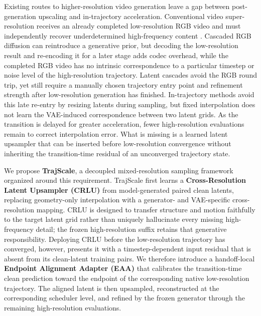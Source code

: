 Existing routes to higher-resolution video generation leave a gap between
post-generation upscaling and in-trajectory acceleration. Conventional video
super-resolution receives an already completed low-resolution RGB video and
must independently recover underdetermined high-frequency content
\citep{zhou2024upscale,xu2024videogigagan}. Cascaded RGB diffusion can
reintroduce a generative prior, but decoding the low-resolution result and
re-encoding it for a later stage adds codec overhead, while the completed RGB
video has no intrinsic correspondence to a particular timestep or noise level
of the high-resolution trajectory. Latent cascades avoid the RGB round trip,
yet still require a manually chosen trajectory entry point and refinement
strength after low-resolution generation has finished. In-trajectory methods
avoid this late re-entry by resizing latents during sampling, but fixed
interpolation does not learn the VAE-induced correspondence between two latent
grids. As the transition is delayed for greater acceleration, fewer
high-resolution evaluations remain to correct interpolation error. What is
missing is a learned latent upsampler that can be inserted before
low-resolution convergence without inheriting the transition-time residual of
an unconverged trajectory state.

We propose \textbf{TrajScale}, a decoupled mixed-resolution sampling
framework organized around this requirement. TrajScale first learns a
\textbf{Cross-Resolution Latent Upsampler (CRLU)} from model-generated paired
clean latents, replacing geometry-only interpolation with a generator- and
VAE-specific cross-resolution mapping. CRLU is designed to transfer structure
and motion faithfully to the target latent grid rather than uniquely
hallucinate every missing high-frequency detail; the frozen high-resolution
suffix retains that generative responsibility. Deploying CRLU before the
low-resolution trajectory has converged, however, presents it with a
timestep-dependent input residual that is absent from its clean-latent
training pairs. We therefore introduce a handoff-local
\textbf{Endpoint Alignment Adapter (EAA)} that calibrates the transition-time
clean prediction toward the endpoint of the corresponding native
low-resolution trajectory. The aligned latent is then upsampled, reconstructed
at the corresponding scheduler level, and refined by the frozen generator
through the remaining high-resolution evaluations.

